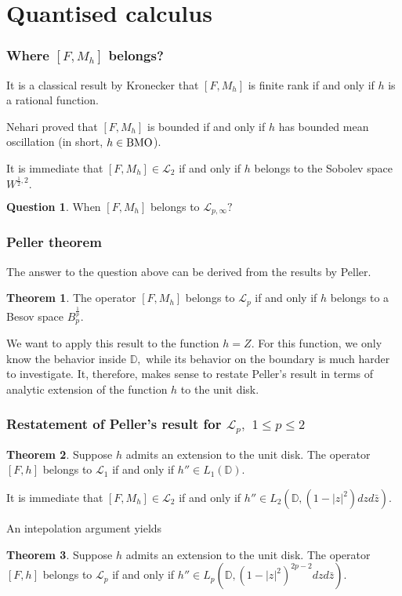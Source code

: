 \documentclass{beamer}
\theoremstyle{definition}
\newtheorem{thm}{Theorem}
\newtheorem{quest}{Question}
\begin{document}
\section{Quantised calculus}

\begin{frame}
\frametitle{Where $[F,M_h]$ belongs?}

It is a classical result by Kronecker that $[F,M_h]$ is finite rank if and only if $h$ is a rational function.

Nehari proved that $[F,M_h]$ is bounded if and only if $h$ has bounded mean oscillation (in short, $h\in {\rm BMO}$).

It is immediate that $[F,M_h]\in\mathcal{L}_2$ if and only if $h$ belongs to the Sobolev space $W^{\frac12,2}.$

\begin{quest} When $[F,M_h]$ belongs to $\mathcal{L}_{p,\infty}?$
\end{quest}
\end{frame}

\begin{frame}
\frametitle{Peller theorem}

The answer to the question above can be derived from the results by Peller.

\begin{thm} The operator $[F,M_h]$ belongs to $\mathcal{L}_p$ if and only if $h$ belongs to a Besov space $B_p^{\frac1p}.$
\end{thm}

We want to apply this result to the function $h=Z.$ For this function, we only know the behavior inside $\mathbb{D},$ while its behavior on the boundary is much harder to investigate. It, therefore, makes sense to restate Peller's result in terms of analytic extension of the function $h$ to the unit disk.
\end{frame}

\begin{frame}
\frametitle{Restatement of Peller's result for $\mathcal{L}_p,$ $1\leq p\leq 2$}

\begin{thm} Suppose $h$ admits an extension to the unit disk. The operator $[F,h]$ belongs to $\mathcal{L}_1$ if and only if $h''\in L_1(\mathbb{D}).$
\end{thm}

It is immediate that $[F,M_h]\in\mathcal{L}_2$ if and only if $h''\in L_2(\mathbb{D},(1-|z|^2)dzd\bar{z}).$

An intepolation argument yields

\begin{thm} Suppose $h$ admits an extension to the unit disk. The operator $[F,h]$ belongs to $\mathcal{L}_p$ if and only if $h''\in L_p(\mathbb{D},(1-|z|^2)^{2p-2}dzd\bar{z}).$
\end{thm}
\end{frame}
\end{document}
